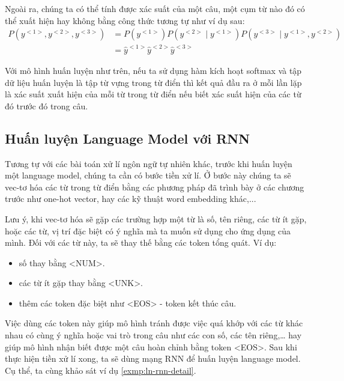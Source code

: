 Ngoài ra, chúng ta có thể tính được xác suất của một câu, một cụm từ nào đó có thể xuất hiện hay không bằng công thức tương tự như ví dụ sau:
\begin{align*}
    P(y^{<1>}, y^{<2>}, y^{<3>}) & = P(y^{<1>})P(y^{<2>} \mid y^{<1>})P(y^{<3>} \mid y^{<1>}, y^{<2>})\\
    & = \hat{y}^{<1>}\hat{y}^{<2>}\hat{y}^{<3>}
\end{align*}

Với mô hình huấn luyện như trên, nếu ta sử dụng hàm kích hoạt softmax và tập dữ liệu huấn luyện là tập từ vựng trong từ điển thì kết quả đầu ra ở mỗi lần lặp là xác suất xuất hiện của mỗi từ trong từ điển nếu biết xác suất hiện của các từ đó trước đó trong câu.

\subsection{Huấn luyện Language Model với RNN}
Tương tự với các bài toán xử lí ngôn ngữ tự nhiên khác, trước khi huấn luyện một language model, chúng ta cần có bước tiền xử lí. Ở bước này chúng ta sẽ vec-tơ hóa các từ trong từ điển bằng các phương pháp đã trình bày ở các chương trước như one-hot vector, hay các kỹ thuật word embedding khác,...\par
Lưu ý, khi vec-tơ hóa sẽ gặp các trường hợp một từ là số, tên riêng, các từ ít gặp, hoặc các từ, vị trí đặc biệt có ý nghĩa mà ta muốn sử dụng cho ứng dụng của mình. Đối với các từ này, ta sẽ thay thế bằng các token tổng quát. Ví dụ:
\begin{itemize}
\setlength\itemsep{-0.5em}
\item số thay bằng <NUM>.
\item các từ ít gặp thay bằng <UNK>.
\item thêm các token đặc biệt như <EOS> - token kết thúc câu.
\end{itemize}\par
Việc dùng các token này giúp mô hình tránh được việc quá khớp với các từ khác nhau có cùng ý nghĩa hoặc vai trò trong câu như các con số, các tên riêng,… hay giúp mô hình nhận biết được một câu hoàn chỉnh bằng token <EOS>. Sau khi thực hiện tiền xử lí xong, ta sẽ dùng mạng RNN để huấn luyện language model. Cụ thể, ta cùng khảo sát ví dụ \ref{exmp:ln-rnn-detail}.\par

